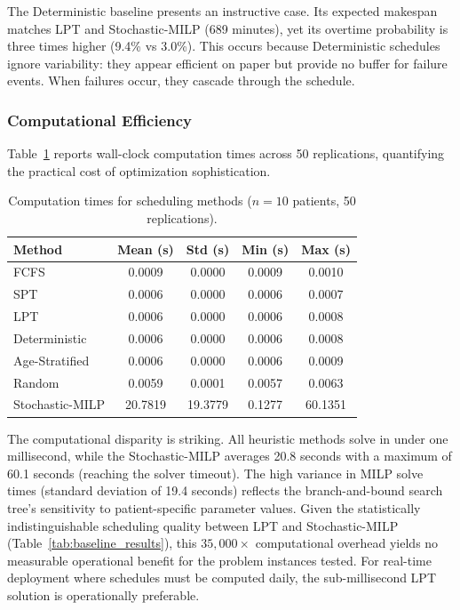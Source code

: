 \documentclass[11pt,a4paper]{article}
\begin{document}
The Deterministic baseline presents an instructive case. Its expected makespan matches LPT and Stochastic-MILP (689 minutes), yet its overtime probability is three times higher (9.4\% vs 3.0\%). This occurs because Deterministic schedules ignore variability: they appear efficient on paper but provide no buffer for failure events. When failures occur, they cascade through the schedule.

\subsubsection{Computational Efficiency}

Table~\ref{tab:computation_times} reports wall-clock computation times across 50 replications, quantifying the practical cost of optimization sophistication.


\begin{table}[H]
\centering
\caption{Computation times for scheduling methods ($n = 10$ patients, 50 replications).}
\label{tab:computation_times}
\begin{tabular}{lcccc}
\toprule
Method & Mean (s) & Std (s) & Min (s) & Max (s) \\
\midrule
FCFS & 0.0009 & 0.0000 & 0.0009 & 0.0010 \\
SPT & 0.0006 & 0.0000 & 0.0006 & 0.0007 \\
LPT & 0.0006 & 0.0000 & 0.0006 & 0.0008 \\
Deterministic & 0.0006 & 0.0000 & 0.0006 & 0.0008 \\
Age-Stratified & 0.0006 & 0.0000 & 0.0006 & 0.0009 \\
Random & 0.0059 & 0.0001 & 0.0057 & 0.0063 \\
Stochastic-MILP & 20.7819 & 19.3779 & 0.1277 & 60.1351 \\
\bottomrule
\end{tabular}
\end{table}

The computational disparity is striking. All heuristic methods solve in under one millisecond, while the Stochastic-MILP averages 20.8 seconds with a maximum of 60.1 seconds (reaching the solver timeout). The high variance in MILP solve times (standard deviation of 19.4 seconds) reflects the branch-and-bound search tree's sensitivity to patient-specific parameter values. Given the statistically indistinguishable scheduling quality between LPT and Stochastic-MILP (Table~\ref{tab:baseline_results}), this $35{,}000\times$ computational overhead yields no measurable operational benefit for the problem instances tested. For real-time deployment where schedules must be computed daily, the sub-millisecond LPT solution is operationally preferable.
\end{document}
